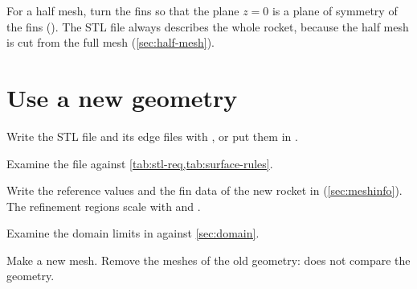 For a half mesh, turn the fins so that the plane $z = 0$ is a plane of symmetry of the
fins (). The STL file always describes the whole rocket, because the
half mesh is cut from the full mesh (\cref{sec:half-mesh}).

\section{Use a new geometry}

\begin{steps}
\item Write the STL file and its edge files with , or put them in
  .
\item Examine the file against \cref{tab:stl-req,tab:surface-rules}.
\item Write the reference values and the fin data of the new rocket in
   (\cref{sec:meshinfo}). The refinement regions scale with
   and .
\item Examine the domain limits in  against \cref{sec:domain}.
\item Make a new mesh. Remove the meshes of the old geometry:  does
  not compare the geometry.
\end{steps}
